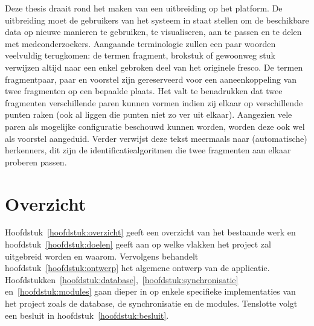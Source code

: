 Deze thesis draait rond het maken van een uitbreiding op het platform. De uitbreiding moet de gebruikers van het systeem in staat stellen om de beschikbare data op nieuwe manieren te gebruiken, te visualiseren, aan te passen en te delen met medeonderzoekers. Aangaande terminologie zullen een paar woorden veelvuldig terugkomen: de termen fragment, brokstuk of gewoonweg stuk verwijzen altijd naar een enkel gebroken deel van het originele fresco. De termen fragmentpaar, paar en voorstel zijn gereserveerd voor een aaneenkoppeling van twee fragmenten op een bepaalde plaats. Het valt te benadrukken dat twee fragmenten verschillende paren kunnen vormen indien zij elkaar op verschillende punten raken (ook al liggen die punten niet zo ver uit elkaar). Aangezien vele paren als mogelijke configuratie beschouwd kunnen worden, worden deze ook wel als voorstel aangeduid. Verder verwijst deze tekst meermaals naar (automatische) herkenners, dit zijn de identificatiealgoritmen die twee fragmenten aan elkaar proberen passen.\\

\section{Overzicht}
Hoofdstuk~\ref{hoofdstuk:overzicht} geeft een overzicht van het bestaande werk en hoofdstuk~\ref{hoofdstuk:doelen} geeft aan op welke vlakken het project zal uitgebreid worden en waarom. Vervolgens behandelt hoofdstuk~\ref{hoofdstuk:ontwerp} het algemene ontwerp van de applicatie. Hoofdstukken~\ref{hoofdstuk:database},~\ref{hoofdstuk:synchronisatie} en~\ref{hoofdstuk:modules} gaan dieper in op enkele specifieke implementaties van het project zoals de database, de synchronisatie en de modules. Tenslotte volgt een besluit in hoofdstuk~\ref{hoofdstuk:besluit}.
